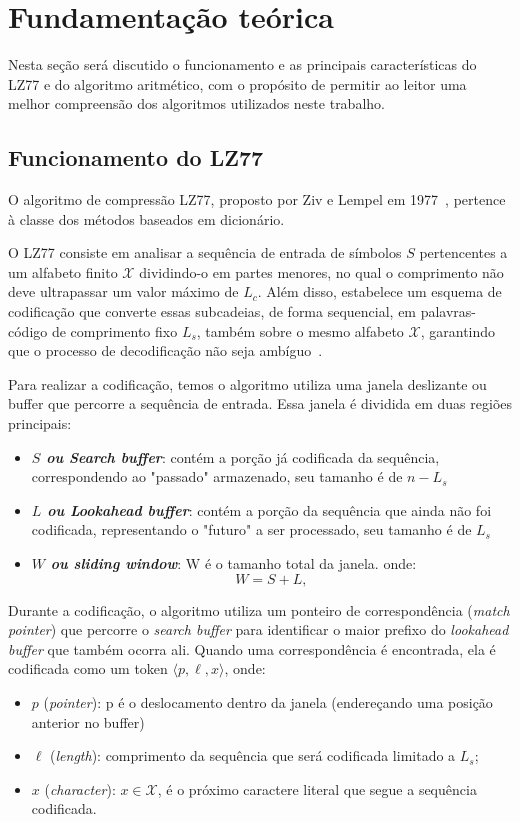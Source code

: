 \chapter{Fundamentação teórica}\label{cap:revisao}

Nesta seção será discutido o funcionamento e as principais características do
LZ77 e do algoritmo aritmético, com o propósito de permitir ao leitor uma
melhor compreensão dos algoritmos utilizados neste trabalho.

\section{Funcionamento do LZ77}\label{sec:LZ77}

O algoritmo de compressão LZ77, proposto por Ziv e Lempel em
1977~\cite{1055714}, pertence à classe dos métodos baseados em dicionário.

O LZ77 consiste em analisar a sequência de entrada de símbolos $S$ pertencentes a um alfabeto finito
$\mathcal{X}$ dividindo-o em partes menores, no qual o comprimento não deve ultrapassar
um valor máximo de $L_{c}$. Além disso, estabelece um esquema de codificação que converte essas subcadeias, 
de forma sequencial, em palavras-código de comprimento fixo $L_{s}$, também sobre o mesmo alfabeto $\mathcal{X}$, garantindo que o processo de decodificação não seja ambíguo~\cite{1055714}.

Para realizar a codificação, temos o algoritmo utiliza uma janela deslizante ou buffer que
percorre a sequência de entrada. Essa janela é dividida em duas regiões
principais:

\begin{itemize}
  \item \textbf{\textit{$S$ ou Search buffer}}: contém a porção já codificada da sequência, correspondendo ao "passado" armazenado, seu tamanho é de $n - L_{s}$
  \item \textbf{\textit{$L$ ou Lookahead buffer}}: contém a porção da sequência que ainda não foi codificada, representando o "futuro" a ser processado, seu tamanho é de $L_{s}$
  \item \textbf{\textit{$W$ ou sliding window}}:  W é o tamanho total da janela. onde:
\[
    W = S + L,
\]
\end{itemize}


Durante a codificação, o algoritmo utiliza um ponteiro de correspondência
(\textit{match pointer}) que percorre o \textit{search buffer} para identificar
o maior prefixo do \textit{lookahead buffer} que também ocorra ali. Quando uma
correspondência é encontrada, ela é codificada como um token $\langle p, \ell,
  x \rangle$, onde:
\begin{itemize}
  \item $p$ (\textit{pointer}): p é o deslocamento dentro da janela (endereçando uma posição anterior no buffer)
  \item $\ell$ (\textit{length}): comprimento da sequência que será codificada limitado a $L_{s}$;
  \item $x$ (\textit{character}): $x \in \mathcal{X}$, é o próximo caractere literal que segue a sequência codificada.
\end{itemize}

